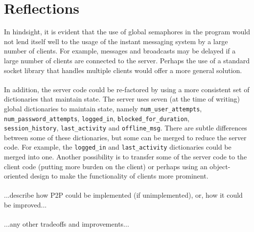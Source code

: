 \documentclass[12pt,a4paper]{article}
\begin{document}
\section{Reflections}
\label{sec:reflections}

In hindsight, it is evident that the use of global semaphores in the program would not lend itself well to the usage of the instant messaging system by a large number of clients. For example, messages and broadcasts may be delayed if a large number of clients are connected to the server. Perhaps the use of a standard socket library that handles multiple clients would offer a more general solution.
\\\\
In addition, the server code could be re-factored by using a more consistent set of dictionaries that maintain state. The server uses seven (at the time of writing) global dictionaries to maintain state, namely \verb|num_user_attempts|, \verb|num_password_attempts|, \verb|logged_in|, \verb|blocked_for_duration|, \\ \verb|session_history|, \verb|last_activity| and \verb|offline_msg|. There are subtle differences between some of these dictionaries, but some can be merged to reduce the server code. For example, the \verb|logged_in| and \verb|last_activity| dictionaries could be merged into one. Another possibility is to transfer some of the server code to the client code (putting more burden on the client) or perhaps using an object-oriented design to make the functionality of clients more prominent.
\\\\
...describe how P2P could be implemented (if unimplemented), or, how it could be improved...
\\\\
...any other tradeoffs and improvements...
\end{document}
